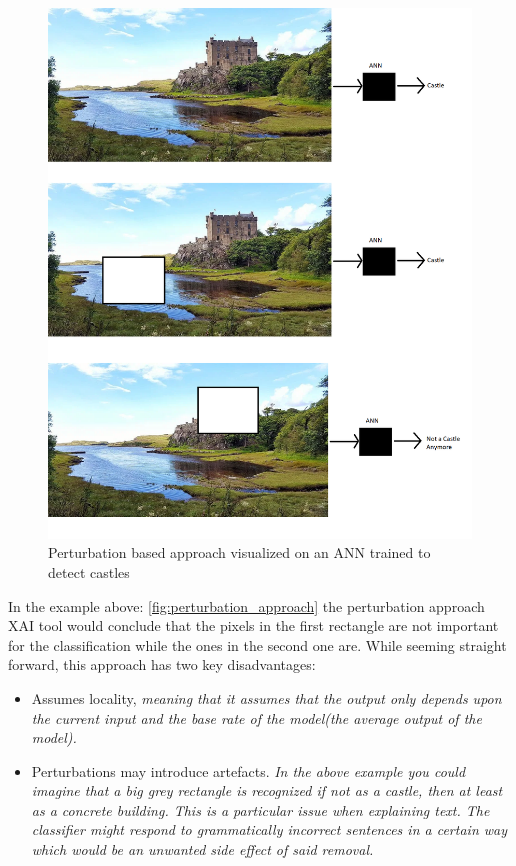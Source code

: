 \begin{figure}[H]
    \centering
    \includegraphics[width=\linewidth]{images/02_related_works/Garden-Dunvegan-Castle_Modified.png}
    \caption{Perturbation based approach visualized on an ANN trained to detect castles \cite{castle_image}}
    \label{fig:perturbation_approach}
\end{figure}

In the example above: \autoref{fig:perturbation_approach} the perturbation approach XAI tool would conclude that the pixels in the first rectangle are not important for the classification while the ones in the second one are. While seeming straight forward, this approach has two key disadvantages:

\begin{itemize}
    \item Assumes locality, \textit{meaning that it assumes that the output only depends upon the current input and the base rate of the model(the average output of the model).}
    \item Perturbations may introduce artefacts. \textit{In the above example you could imagine that a big grey rectangle is recognized if not as a castle, then at least as a concrete building. This is a particular issue when explaining text. The classifier might respond to grammatically incorrect sentences in a certain way which would be an unwanted side effect of said removal.}
\end{itemize}


